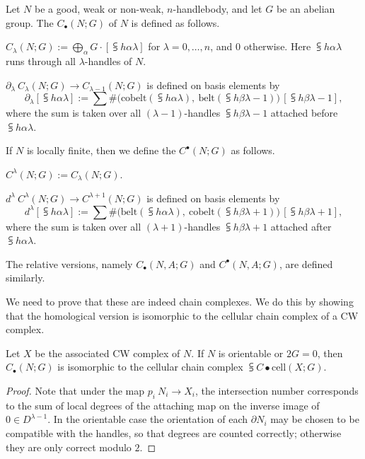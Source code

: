 \begin{definition}
Let $N$ be a good, weak or non-weak, $n$-handlebody,
and let $G$ be an abelian group.
The  $C_\bullet(N;G)$ of $N$ is defined as follows.
\begin{itms}
\item $C_\lambda(N;G):=\bigoplus_\alpha G\cdot[\subsup h\alpha\lambda]$
for $\lambda=0,\dotsc,n$, and $0$ otherwise.
Here $\subsup h\alpha\lambda$ runs through all $\lambda$-handles of $N$.
\item $\partial_\lambda\:C_\lambda(N;G)\to C_{\lambda-1}(N;G)$ is defined on basis elements by
\[\partial_\lambda[\subsup h\alpha\lambda]:=\sum\#\bigl(\text{cobelt}(\subsup h\alpha\lambda),\ \text{belt}(\subsup h\beta{\lambda-1})\bigr)\,[\subsup h\beta{\lambda-1}],\]
where the sum is taken over all $(\lambda-1)$-handles $\subsup h\beta{\lambda-1}$
attached before $\subsup h\alpha\lambda$.
\end{itms}
If $N$ is locally finite, then we define the 
$C^\bullet(N;G)$ as follows.
\begin{itms}
\item $C^\lambda(N;G):=C_\lambda(N;G)$.
\item $d^\lambda\:C^\lambda(N;G)\to C^{\lambda+1}(N;G)$ is defined on basis elements by
\[d^\lambda[\subsup h\alpha\lambda]:=\sum\#\bigl(\text{belt}(\subsup h\alpha\lambda),\ \text{cobelt}(\subsup h\beta{\lambda+1})\bigr)\,[\subsup h\beta{\lambda+1}],\]
where the sum is taken over all $(\lambda+1)$-handles $\subsup h\beta{\lambda+1}$
attached after $\subsup h\alpha\lambda$.
\end{itms}
The relative versions, 
namely $C_\bullet(N,A;G)$ and $C^\bullet(N,A;G)$, are defined similarly.
\end{definition}

We need to prove that these are indeed chain complexes.
We do this by showing that the homological version
is isomorphic to the cellular chain complex
of a CW complex.

\begin{proposition}
Let $X$ be the associated CW complex of $N$.
If $N$ is orientable or $2G=0$,
then $C_\bullet(N;G)$ is isomorphic to the
cellular chain complex $\subsup C\bullet{\mathrm{cell}}(X;G)$.
\end{proposition}

\begin{proof}
Note that under the map $p_i\:N_i\to X_i$,
the intersection number corresponds to the
sum of local degrees
of the attaching map on the inverse image of $0\in D^{\lambda-1}$.
In the orientable case the orientation of each $\partial N_i$
may be chosen to be compatible with the handles,
so that degrees are counted correctly;
otherwise they are only correct modulo $2$.
\end{proof}


